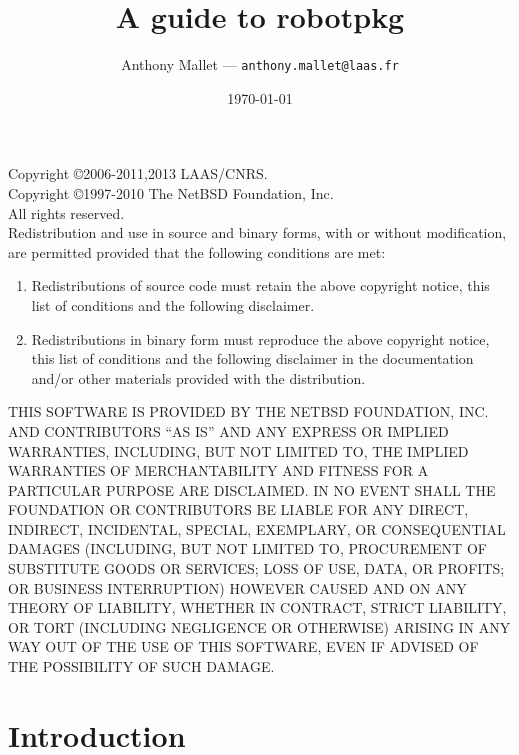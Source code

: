 \documentclass[a4paper,11pt]{book}
\title{A guide to robotpkg}
\author{Anthony Mallet --- {\tt anthony.mallet@laas.fr}}
\date{\today}
\begin{document}

\frontmatter
\maketitle

{\small\parindent0pt
Copyright \copyright 2006-2011,2013 LAAS/CNRS.\\
Copyright \copyright 1997-2010 The NetBSD Foundation, Inc.\\
All rights reserved.\\

Redistribution and use in source and binary forms, with or without
modification, are permitted provided that the following conditions
are met:

\begin{enumerate}
\item Redistributions of source code must retain the above copyright
      notice, this list of conditions and the following disclaimer.

\item Redistributions in binary form must reproduce the above copyright
      notice, this list of conditions and the following disclaimer in the
      documentation and/or other materials provided with the distribution.
\end{enumerate}

THIS SOFTWARE IS PROVIDED BY THE NETBSD FOUNDATION, INC. AND CONTRIBUTORS
``AS IS'' AND ANY EXPRESS OR IMPLIED WARRANTIES, INCLUDING, BUT NOT LIMITED
TO, THE IMPLIED WARRANTIES OF MERCHANTABILITY AND FITNESS FOR A PARTICULAR
PURPOSE ARE DISCLAIMED.  IN NO EVENT SHALL THE FOUNDATION OR CONTRIBUTORS
BE LIABLE FOR ANY DIRECT, INDIRECT, INCIDENTAL, SPECIAL, EXEMPLARY, OR
CONSEQUENTIAL DAMAGES (INCLUDING, BUT NOT LIMITED TO, PROCUREMENT OF
SUBSTITUTE GOODS OR SERVICES; LOSS OF USE, DATA, OR PROFITS; OR BUSINESS
INTERRUPTION) HOWEVER CAUSED AND ON ANY THEORY OF LIABILITY, WHETHER IN
CONTRACT, STRICT LIABILITY, OR TORT (INCLUDING NEGLIGENCE OR OTHERWISE)
ARISING IN ANY WAY OUT OF THE USE OF THIS SOFTWARE, EVEN IF ADVISED OF THE
POSSIBILITY OF SUCH DAMAGE.
}


\tableofcontents
\mainmatter

\chapter{Introduction}
\label{chapter:introduction}

\end{document}
